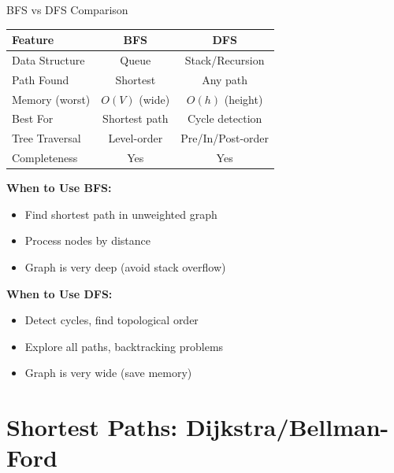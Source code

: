\documentclass[aspectratio=169]{beamer}
\begin{document}
\begin{frame}{BFS vs DFS Comparison}
  \begin{center}
  \begin{tabular}{|l|c|c|}
    \hline
    \textbf{Feature} & \textbf{BFS} & \textbf{DFS} \\
    \hline
    Data Structure & Queue & Stack/Recursion \\
    \hline
    Path Found & Shortest & Any path \\
    \hline
    Memory (worst) & $O(V)$ (wide) & $O(h)$ (height) \\
    \hline
    Best For & Shortest path & Cycle detection \\
    \hline
    Tree Traversal & Level-order & Pre/In/Post-order \\
    \hline
    Completeness & Yes & Yes \\
    \hline
  \end{tabular}
  \end{center}

  \vspace{0.3cm}
  \textbf{When to Use BFS:}
  \begin{itemize}
    \item Find shortest path in unweighted graph
    \item Process nodes by distance
    \item Graph is very deep (avoid stack overflow)
  \end{itemize}

  \vspace{0.2cm}
  \textbf{When to Use DFS:}
  \begin{itemize}
    \item Detect cycles, find topological order
    \item Explore all paths, backtracking problems
    \item Graph is very wide (save memory)
  \end{itemize}
\end{frame}

\section{Shortest Paths: Dijkstra/Bellman-Ford}
\end{document}
